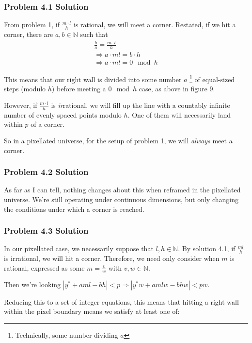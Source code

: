 \documentclass[11pt, oneside]{article} 	%
\begin{document}
\subsubsection{Problem 4.1 Solution}

From problem 1, if $\frac{m \cdot l}{h}$ is rational, we will meet a corner.  Restated, if we hit a corner, there are $a, b \in \mathbb{N}$ 
such that  
\begin{align}
\frac{b}{a} = \frac{m \cdot l}{h} \\
 \Rightarrow a \cdot ml = b \cdot h \\ 
  \Rightarrow a \cdot ml = 0 \mod h  
\end{align}

This means that our right wall is divided into some number $a$ \footnote{Technically, some number dividing $a$} of equal-sized steps (modulo $h$) before meeting a $0\mod h$ case, as above in figure 9.  

However, if $\frac{m \cdot l}{h}$ is \emph{ir}rational, we will fill up the line with a countably infinite number of evenly spaced points modulo $h$.  One of them will necessarily land within $p$ of a corner. 

So in a pixellated universe, for the setup of problem 1, we will \emph{always} meet a corner.



\subsubsection{Problem 4.2 Solution}

As far as I can tell, nothing changes about this when reframed in the pixellated universe.  We're still operating under continuous dimensions, but only changing the conditions under which a corner is reached.

\subsubsection{Problem 4.3 Solution}

In our pixellated case, we necessarily suppose that $l, h \in \mathbb{N}$.  By solution 4.1, if $\frac{ml}{h}$ is irrational, we will hit a corner. Therefore, we need only consider when $m$ is rational, expressed as some $m = \frac{v}{w}$ with $ v, w \in \mathbb{N}$.

Then we're looking $| y^* + aml - bh | < p \Rightarrow |y^*w+ amlw - bhw| < pw$. 

Reducing this to a set of integer equations, this means that hitting a right wall within the pixel boundary means we satisfy at least one of:
\end{document}
